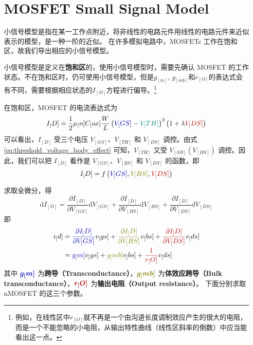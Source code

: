 \section{MOSFET Small Signal Model}

小信号模型是指在某一工作点附近，将非线性的电路元件用线性的电路元件来近似表示的模型，是一种一阶的近似。
在许多模拟电路中，MOSFETs 工作在饱和区，故我们导出相应的小信号模型。
\begin{hint}
    小信号模型是定义在\textbf{饱和区}的，使用小信号模型时，需要先确认 MOSFET 的工作状态。不在饱和区时，仍可使用小信号模型，但是$g_[m]$, $g_[mb]$和$r_[O]$的表达式会有不同，需要根据相应状态的$I_[D]$方程进行偏导。\footnote{例如，在线性区中$r_[O]$就不再是一个由沟道长度调制效应产生的很大的电阻，而是一个不能忽略的小电阻，从输出特性曲线（线性区斜率的倒数）中应当能看出这一点。}
\end{hint}

在饱和区，MOSFET 的电流表达式为
\begin{equation}
    I_[D] = \frac{1}{2} \mu_[n] C_[ox] \frac{W}{L} \left( \textcolor{deep-blue}{V_[GS]} - \textcolor{Teal}{V_[TH]} \right)^2 \left( 1 + \lambda \textcolor{deep-red}{V_[DS]} \right)
\end{equation}
可以看出，$I_[D]$ 受三个电压 $V_[GS]$、$V_[TH]$ 和 $V_[DS]$ 调控。由式 \ref{eq:threshold_voltage_body_effect} 可知，$V_[TH]$ 又受 $V_[SB](V_[BS])$ 调控。因此，我们可以把 $I_[D]$ 看作是 $V_[GS]$、$V_[BS]$ 和 $V_[DS]$ 的函数，即
\begin{equation}
    I_[D] = f \left( \textcolor{deep-blue}{V_[GS]}, \textcolor{Olive}{V_[BS]}, \textcolor{deep-red}{V_[DS]} \right)
\end{equation}

求取全微分，得
\begin{equation}
    \mathrm{d} I_[D] = \frac{\partial I_[D]}{\partial V_[GS]} \mathrm{d} V_[GS] + \frac{\partial I_[D]}{\partial V_[BS]} \mathrm{d} V_[BS] + \frac{\partial I_[D]}{\partial V_[DS]} \mathrm{d} V_[DS]
\end{equation}
即
\begin{equation}
    \begin{aligned}
        i_[d] &= \textcolor{deep-blue}{\frac{\partial I_[D]}{\partial V_[GS]}} v_[gs] + \textcolor{Olive}{\frac{\partial I_[D]}{\partial V_[BS]}} v_[bs] + \textcolor{deep-red}{\frac{\partial I_[D]}{\partial V_[DS]}} v_[ds] \\
        &= \textcolor{deep-blue}{g_[m]} v_[gs] + \textcolor{Olive}{g_[mb]} v_[bs] + \textcolor{deep-red}{\frac{1}{r_[O]}} v_[ds]
    \end{aligned}
\end{equation}
其中 $\bm{\textcolor{deep-blue}{g_[m]}}$ 为\textbf{跨导（Transconductance）}，$\bm{\textcolor{Olive}{g_[mb]}}$ 为\textbf{体效应跨导（Bulk transconductance）}，$\bm{\textcolor{deep-red}{r_[O]}}$ 为\textbf{输出电阻（Output resistance）}。
下面分别求取 nMOSFET 的这三个参数。

